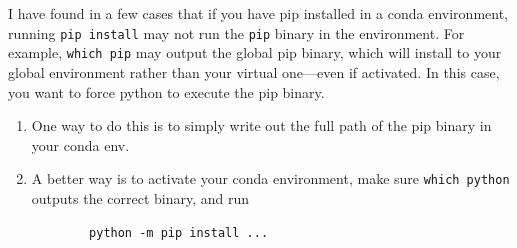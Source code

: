   \begin{example}[Warning]
    \label{ex:warning}
    I have found in a few cases that if you have pip installed in a conda environment, running \texttt{pip install} may not run the \texttt{pip} binary in the environment. For example, \texttt{which pip} may output the global pip binary, which will install to your global environment rather than your virtual one---even if activated. In this case, you want to force python to execute the pip binary. 
    \begin{enumerate}
      \item One way to do this is to simply write out the full path of the pip binary in your conda env. 
      \item A better way is to activate your conda environment, make sure \texttt{which python} outputs the correct binary, and run 
      \begin{lstlisting}
        python -m pip install ...
      \end{lstlisting}
    \end{enumerate}
  \end{example}


